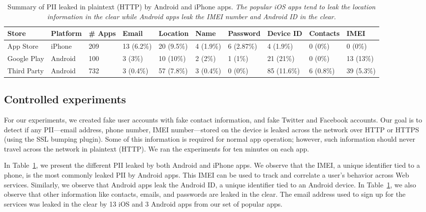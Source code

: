 \begin{table}[t]    
    \centering
    \begin{small}
    \begin{tabular}{|l|l|l|l|l|l|l|l|l|l|}
       \hline
       {\bf Store}&{\bf Platform}&{\bf \# Apps}&{\bf Email}& {\bf Location}& {\bf Name} &{\bf Password}& {\bf Device ID}& {\bf Contacts}& {\bf IMEI}\\
       \hline
       App Store&iPhone&209&13 (6.2\%) &20 (9.5\%)&4 (1.9\%)&6 (2.87\%)&4 (1.9\%)&0 (0\%)&0 (0\%)\\
       \hline
       Google Play&Android&100&3 (3\%)&10 (10\%)&2 (2\%)&1 (1\%)&21 (21\%)&0 (0\%)&13 (13\%)\\
       \hline
Third Party&Android&732&3 (0.4\%)&57 (7.8\%)&3 (0.4\%)&0 (0\%)&85 (11.6\%)&6 (0.8\%)&39 (5.3\%)\\
       \hline
    \end{tabular}
    \end{small}
    \caption{Summary of PII leaked in plaintext (HTTP) by Android and iPhone apps. \emph{The popular iOS apps tend to leak the location information in the clear while Android apps leak the IMEI number and Android ID in the clear. }}
    \label{tab:pii}
\end{table}

\subsection{Controlled experiments}

For our experiments, we created fake user accounts with fake contact
information, and fake Twitter and Facebook accounts.  Our goal is to
detect if any PII---email
address, phone number, IMEI number---stored on the device is leaked
across the network over HTTP or HTTPS (using the SSL bumping plugin).
Some of this information is required for normal app operation; however, such information should
never travel across the network in plaintext (HTTP).  We ran the experiments for ten minutes on each app.

In Table~\ref{tab:pii}, we present the different PII leaked by both Android and iPhone apps.  We observe that
the IMEI, a unique identifier tied to a phone, is the most commonly
leaked PII by Android apps.  This IMEI can be used to track
and correlate a user's behavior across Web services.  Similarly, we
observe that Android apps leak the Android ID, a unique
identifier tied to an Android device.  In Table~\ref{tab:pii}, we also
observe that other information like contacts, emails, and passwords
are leaked in the clear.  The email address used to sign
up for the services was leaked in the clear by 13 iOS and 3 Android
apps from our set of popular apps.

